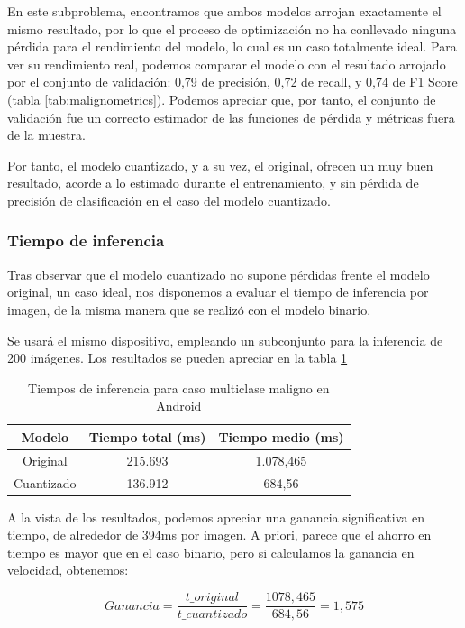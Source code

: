 En este subproblema, encontramos que ambos modelos arrojan exactamente el mismo resultado, por lo que el proceso de optimización no ha conllevado ninguna pérdida para el rendimiento del modelo, lo cual es un caso totalmente ideal. Para ver su rendimiento real, podemos comparar el modelo con el resultado arrojado por el conjunto de validación:  0,79 de precisión,  0,72 de recall, y  0,74 de F1 Score (tabla \ref{tab:malignometrics}).  Podemos apreciar que, por tanto, el conjunto de validación fue un correcto estimador de las funciones de pérdida y métricas fuera de la muestra.

Por tanto, el modelo cuantizado, y a su vez, el original, ofrecen un muy buen resultado, acorde a lo estimado durante el entrenamiento, y sin pérdida de precisión de clasificación en el caso del modelo cuantizado. 

\subsubsection{Tiempo de inferencia}

Tras observar que el modelo cuantizado no supone pérdidas frente el modelo original, un caso ideal, nos disponemos a evaluar el tiempo de inferencia por imagen, de la misma manera que se realizó con el modelo binario.

Se usará el mismo dispositivo, empleando un subconjunto para la inferencia de 200 imágenes. Los resultados se pueden apreciar en la tabla \ref{infmal}

\begin{table}[H]
	\centering
	\begin{tabular}{|c|c|c|}
		\hline
		Modelo & Tiempo total (ms) & Tiempo medio (ms) \\ \hline
		Original & 215.693 & 1.078,465	 \\ \hline
		Cuantizado & 136.912 & 684,56 \\ \hline
	\end{tabular}
	\caption{Tiempos de inferencia para caso multiclase maligno en Android}
	\label{infmal}
\end{table}

A la vista de los resultados, podemos apreciar una ganancia significativa en tiempo, de alrededor de 394ms por imagen. A priori, parece que el ahorro en tiempo es mayor que en el caso binario, pero si calculamos la ganancia en velocidad, obtenemos:

$$Ganancia = \frac{t\_original}{t\_cuantizado} = \frac{1078,465}{684,56} = 1,575$$


